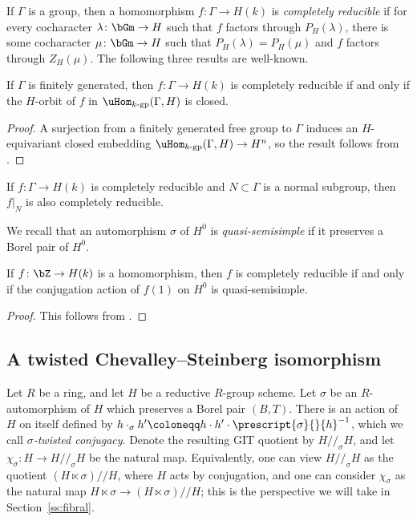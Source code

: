 If $\Gamma$ is a group, then a homomorphism $f\colon \Gamma \to H(k)$ is \textit{completely reducible} if for every cocharacter $\lambda\colon \bGm \to H$ such that $f$ factors through $P_H(\lambda)$, there is some cocharacter $\mu\colon \bGm \to H$ such that $P_H(\lambda) = P_H(\mu)$ and $f$ factors through $Z_H(\mu)$. The following three results are well-known.

\begin{theorem}\cite[3.7]{BMR05}\label{theorem:closed-orbit}
    If $\Gamma$ is finitely generated, then $f\colon \Gamma \to H(k)$ is completely reducible if and only if the $H$-orbit of $f$ in $\uHom_{k\textrm{-}\rm{gp}}(\Gamma, H)$ is closed.
\end{theorem}

\begin{proof}
    A surjection from a finitely generated free group to $\Gamma$ induces an $H$-equivariant closed embedding $\uHom_{k\textrm{-}\rm{gp}}(\Gamma, H) \to H^n$, so the result follows from \cite[3.7]{BMR05}.
\end{proof}

\begin{theorem}\cite[3.10]{BMR05}\label{theorem:bmr-normal}
    If $f\colon \Gamma \to H(k)$ is completely reducible and $N \subset \Gamma$ is a normal subgroup, then $f|_N$ is also completely reducible.
\end{theorem}

We recall that an automorphism $\sigma$ of $H^0$ is \textit{quasi-semisimple} if it preserves a Borel pair of $H^0$. 

\begin{lemma}\label{lemma:bz-semisimple}
    If $f\colon \bZ \to H(k)$ is a homomorphism, then $f$ is completely reducible if and only if the conjugation action of $f(1)$ on $H^0$ is quasi-semisimple.
\end{lemma}

\begin{proof}
    This follows from \cite[Prop.\ 1]{Springer-twisted}.
\end{proof}







\subsection{A twisted Chevalley--Steinberg isomorphism}\label{ss:chevalley-steinberg}

Let $R$ be a ring, and let $H$ be a reductive $R$-group scheme. Let $\sigma$ be an $R$-automorphism of $H$ which preserves a Borel pair $(B, T)$. There is an action of $H$ on itself defined by $h \cdot_{\sigma} h' \coloneqq h \cdot h' \cdot \prescript{\sigma}{}{h}^{-1}$, which we call \textit{$\sigma$-twisted conjugacy}. Denote the resulting GIT quotient by $H/\!/_{\sigma} H$, and let $\chi_{\sigma} \colon H \to H/\!/_{\sigma} H$ be the natural map. Equivalently, one can view $H/\!/_{\sigma} H$ as the quotient $(H \ltimes \sigma)/\!/ H$, where $H$ acts by conjugation, and one can consider $\chi_{\sigma}$ as the natural map $H \ltimes \sigma \to (H \ltimes \sigma)/\!/ H$; this is the perspective we will take in Section~\ref{ss:fibral}. \smallskip

